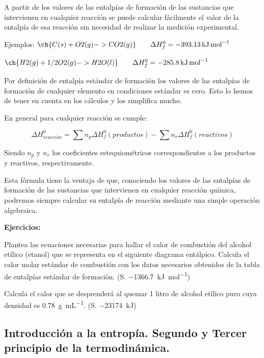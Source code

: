 \documentclass[
  spanish,
]{article}
\begin{document}
A partir de los valores de las entalpías de formación de las sustancias
que intervienen en cualquier reacción se puede calcular fácilmente el
valor de la entalpía de esa reacción sin necesidad de realizar la
medición experimental.

Ejemplos:
\(\ch{C (s) + O2 (g) -> CO2 (g)} \qquad \Delta H_f^0 = \qty{-393,13}{\kJ\per\mol}\)

\(\ch{H2 (g) + 1/2 O2 (g) -> H2O (l)} \qquad \Delta H_f^0 = \qty{-285,8}{\kJ\per\mol}\)

Por definición de entalpía estándar de formación los valores de las
entalpías de formación de cualquier elemento en condiciones estándar es
cero. Esto lo hemos de tener en cuenta en los cálculos y los simplifica
mucho.

En general para cualquier reacción se cumple:

\[\Delta H_{reacción}^{0} = \sum n_{p}\Delta H_{f}^{0}(productos) - \sum n_{r}\Delta H_{f}^{0}(reactivos)\]

Siendo \(n_p\) y \(n_r\) los coeficientes estequiométricos
correspondientes a los productos y reactivos, respectivamente.

Esta fórmula tiene la ventaja de que, conociendo los valores de las
entalpías de formación de las sustancias que intervienen en cualquier
reacción química, podremos siempre calcular su entalpía de reacción
mediante una simple operación algebraica.

\textbf{Ejercicios:}

\begin{exercise}Plantea las ecuaciones necesarias para hallar el calor
de combustión del alcohol etílico (etanol) que se representa en el
siguiente diagrama entálpico. Calcula el calor molar estándar de
combustión con los datos necesarios obtenidos de la tabla de entalpías
estándar de formación. (S. \qty{-1366,7}{\kJ\per\mol})\end{exercise}

\begin{exercise}Calcula el calor que se desprenderá al quemar 1 litro de
alcohol etílico puro cuya densidad es \qty{0,78}{\g\per\mL}. (S.
\qty{-23174}{\kJ})\end{exercise}

\hypertarget{introducciuxf3n-a-la-entropuxeda.-segundo-y-tercer-principio-de-la-termodinuxe1mica.}{%
\subsection{Introducción a la entropía. Segundo y Tercer principio de la
termodinámica.}\label{introducciuxf3n-a-la-entropuxeda.-segundo-y-tercer-principio-de-la-termodinuxe1mica.}}
\end{document}

